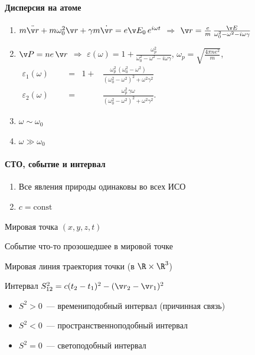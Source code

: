 \documentclass{trchesh}
\newcommand{\deflabel}[1]{
  \makebox[\labelwidth][l]{%
    \parbox[t]{\labelwidth}{\hspace{0pt}\textsf{#1}}%
  }~::
}
\newenvironment{defs}[1][\hspace{12ex}]%
  {\begin{list}{}{%
        \let \makelabel=\deflabel%
        \setlength{\labelwidth}{\widthof{#1}} %
        \setlength{\leftmargin}{\labelwidth+\labelsep}%
        \itemsep=0pt %
      }}%
  {\end{list}}
\begin{document}
\begin{multicols*}{3}
\paragraph{Дисперсия на атоме}
\begin{enumerate}
  \item $m\ddot{\v r} + m \omega_0^2 \v r + \gamma m \dot{\v r} = e \v E_0 \, e^{i \omega t}$
    $ \Rightarrow$ $\v r = \frac em \, \frac{\v E}{\omega_0^2 - \omega^2 - i \omega \gamma} $
  \item $\v P = n e\, \v r$ $ \Rightarrow$ $\varepsilon(\omega) 
    = 1 + \frac{\omega_p^2}{\omega_0^2 - \omega^2 - i \omega \gamma}$, 
    $\omega_p = \textstyle\sqrt{\frac{4 \pi n e^2}{m}}$, \\
    $
    \begin{aligned}
      \varepsilon_1(\omega)& &&=& 1 + 
      &\frac{\omega_p^2 \, (\omega_0^2 - \omega^2)}{(\omega_0^2 - \omega^2)^2 + \omega^2 \gamma^2} \\
      \varepsilon_2(\omega)& &&=& 
      &\frac{\omega_p^2 \, \gamma \omega}{(\omega_0^2 - \omega^2)^2 + \omega^2 \gamma^2}.
    \end{aligned}
    $
  \item $\omega \sim \omega_0$
  \item $\omega \gg \omega_0$
\end{enumerate}

\paragraph{СТО, событие и интервал}
\begin{enumerate}
  \item Все явления природы одинаковы во всех ИСО
  \item $c=\textrm{const}$
\end{enumerate}

\begin{defs}
  \item[Мировая точка] $(x,y,z,t)$
  \item[Событие] что-то прозошедшее в мировой точке
  \item[Мировая линия] траектория точки (в $\R \times \R^3$)
  \item[Интервал] $S_{12}^2 = c(t_2 - t_1)^2 - (\v r_2 - \v r_1)^2$
\end{defs}
\begin{itemize}
  \item $S^2 > 0$~--- времениподобный интервал (причинная связь)
  \item $S^2 < 0$~--- пространственноподобный интервал 
  \item $S^2 = 0$~--- светоподобный интервал
\end{itemize}


\end{multicols*}
\end{document}
